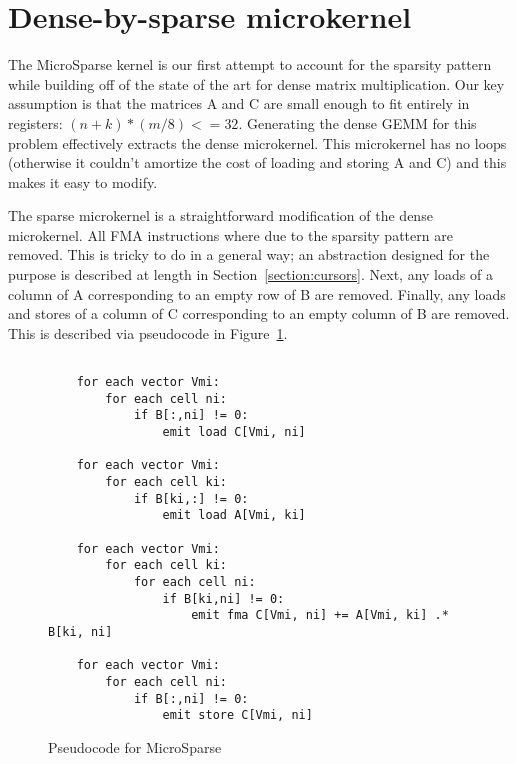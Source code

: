 \section{Dense-by-sparse microkernel}

The MicroSparse kernel is our first attempt to account for the sparsity pattern while building off of the state of the art for dense matrix multiplication. Our key assumption is that the matrices A and C are small enough to fit entirely in registers: $(n + k) * (m/8) <= 32$. Generating the dense GEMM for this problem effectively extracts the dense microkernel. This microkernel has no loops (otherwise it couldn't amortize the cost of loading and storing A and C) and this makes it easy to modify.

The sparse microkernel is a straightforward modification of the dense microkernel. All FMA instructions  where  due to the sparsity pattern are removed. This is tricky to do in a general way; an abstraction designed for the purpose is described at length in Section~\ref{section:cursors}. Next, any loads of a column of A corresponding to an empty row of B are removed. Finally, any loads and stores of a column of C corresponding to an empty column of B are removed. This is described via pseudocode in Figure~\ref{fig:micropseudo}.

\begin{figure}[htb]
\centering
  \begin{verbatim}

    for each vector Vmi:
        for each cell ni:
            if B[:,ni] != 0:
                emit load C[Vmi, ni]

    for each vector Vmi:
        for each cell ki:
            if B[ki,:] != 0:
                emit load A[Vmi, ki]

    for each vector Vmi:
        for each cell ki:
            for each cell ni:
                if B[ki,ni] != 0:
                    emit fma C[Vmi, ni] += A[Vmi, ki] .* B[ki, ni]

    for each vector Vmi:
        for each cell ni:
            if B[:,ni] != 0:
                emit store C[Vmi, ni]

  \end{verbatim}
  \caption{Pseudocode for MicroSparse}
\label{fig:micropseudo}
\end{figure}

